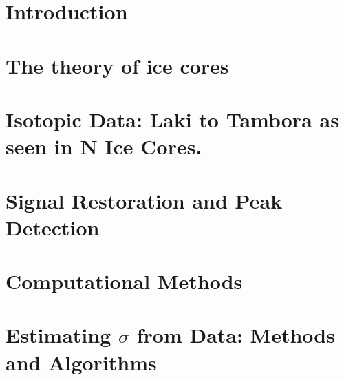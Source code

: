 \documentclass[11pt]{memoir}
\begin{document}
	\newpage
	
	\listoftodos
	
	\tableofcontents*{}
	
	
	\newpage
	\listoffigures
	
	\listoftables
	
	\lstlistoflistings
	
	
	\mainmatter
	
	\chapter[Introduction][Introduction]{Introduction}
	
	
	
	
	\chapter[Ice Theory][Ice Theory]{The theory of ice cores}
	
	
	
	
	\chapter[Data][Data]{Isotopic Data: Laki to Tambora as seen in N Ice Cores.}
	
	
	
	
	
	\chapter[Signal Analysis][Signal Analysis]{Signal Restoration and Peak Detection}
	
	
	
	
	\chapter[Computational Methods]{Computational Methods}
	
	
	
	
	\chapter[Method][Method]{Estimating $\sigma$ from Data: Methods and Algorithms}
	
	
	
\end{document}
